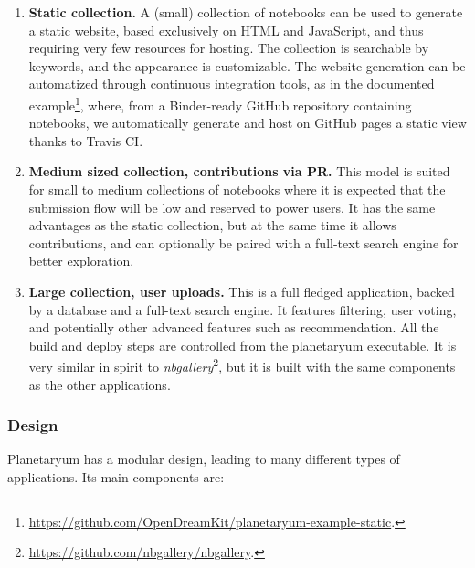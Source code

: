 \begin{enumerate}
\def\labelenumi{\arabic{enumi}.}
\item
  \textbf{Static collection.} A (small) collection of notebooks can be
  used to generate a static website, based exclusively on HTML and
  JavaScript, and thus requiring very few resources for hosting. The
  collection is searchable by keywords, and the appearance is
  customizable. The website generation can be automatized through
  continuous integration tools, as in the documented example\footnote{\url{https://github.com/OpenDreamKit/planetaryum-example-static}.},
  where, from a Binder-ready GitHub repository containing notebooks, we
  automatically generate and host on GitHub pages a static view thanks
  to Travis CI.
\item
  \textbf{Medium sized collection, contributions via PR.} This model is
  suited for small to medium collections of notebooks where it is
  expected that the submission flow will be low and reserved to power
  users. It has the same advantages as the static collection, but at the
  same time it allows contributions, and can optionally be paired with a
  full-text search engine for better exploration.
\item
  \textbf{Large collection, user uploads.} This is a full fledged
  application, backed by a database and a full-text search engine. It
  features filtering, user voting, and potentially other advanced
  features such as recommendation. All the build and deploy steps are
  controlled from the planetaryum executable. It is very similar in
  spirit to \emph{nbgallery}\footnote{\url{https://github.com/nbgallery/nbgallery}.},
  but it is built with the same components as the other applications.
\end{enumerate}

\hypertarget{design}{%
\subsubsection{Design}\label{design}}

Planetaryum has a modular design, leading to many different types of
applications. Its main components are:

